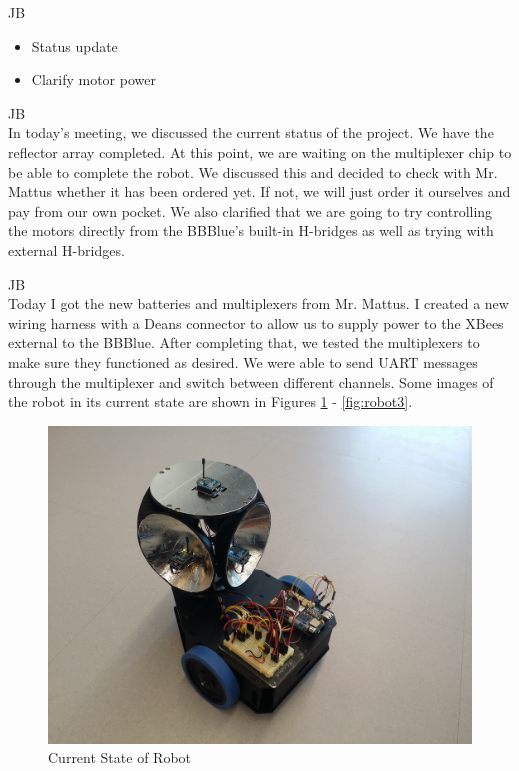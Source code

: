\documentclass[fontsize=11pt, %
                             paper=letter, %
                             openany, %
                             captions=tableheading,
                             index=totoc,
                             hyperref]{labbook}
\begin{document}
\begin{addmargin}[0cm]{0cm}
JB\\
\begin{itemize}
    \item Status update
    \item Clarify motor power
\end{itemize}

JB\\
In today's meeting, we discussed the current status of the project. We have the reflector array completed. At this point, we are waiting on the multiplexer chip to be able to complete the robot. We discussed this and decided to check with Mr. Mattus whether it has been ordered yet. If not, we will just order it ourselves and pay from our own pocket. We also clarified that we are going to try controlling the motors directly from the BBBlue's built-in H-bridges as well as trying with external H-bridges.

JB\\
Today I got the new batteries and multiplexers from Mr. Mattus. I created a new wiring harness with a Deans connector to allow us to supply power to the XBees external to the BBBlue. After completing that, we tested the multiplexers to make sure they functioned as desired. We were able to send UART messages through the multiplexer and switch between different channels. Some images of the robot in its current state are shown in Figures \ref{fig:robot1} - \ref{fig:robot3}.

\begin{figure}
    \center
    \includegraphics[width=4.5in]{figs/img/robot1.jpg}
    \caption{Current State of Robot}
    \label{fig:robot1}
\end{figure}


\end{addmargin}
\end{document}
